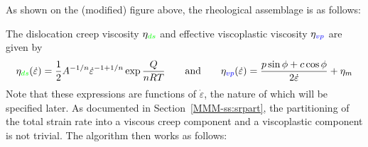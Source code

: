 As shown on the (modified) figure above, the rheological assemblage is as follows:
\begin{center}

\end{center}
The dislocation creep viscosity $\eta_{\color{green}ds}$ and effective 
viscoplastic viscosity $\eta_{\color{blue}vp}$ are given by 
\[
\eta_{\color{green}ds}(\dot\varepsilon) 
= \frac{1}{2} A^{-1/n} \dot{\varepsilon}^{-1+1/n} \exp \frac{Q}{nRT}
\qquad
\text{and}
\qquad
\eta_{\color{blue}vp}(\dot\varepsilon) 
= \frac{p \sin \phi + c \cos \phi}{2 \dot{\varepsilon}}  + \eta_{m}
\]
Note that these expressions are functions of $\dot\varepsilon$, the nature of which will be specified later. 
As documented in Section~\ref{MMM-ss:srpart}, 
the partitioning of the total strain rate into a viscous creep component and a viscoplastic component 
is not trivial.  
The algorithm then works as follows:

